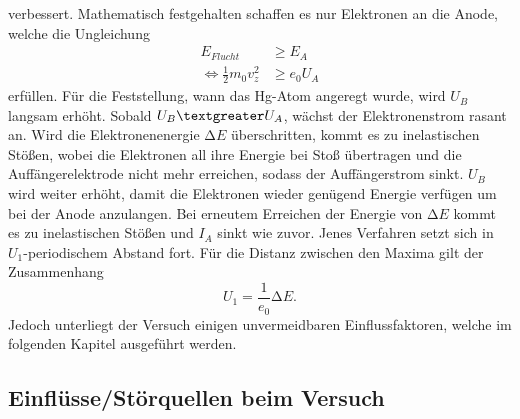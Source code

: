verbessert. Mathematisch festgehalten schaffen es nur Elektronen an die 
Anode, welche die Ungleichung 
\begin{align}
    \label{eqn:3}
                                    E_{Flucht} &\geq E_{A} \\
    \Longleftrightarrow \frac{1}{2} m_0 v_z ^2 &\geq e_0 U_A
\end{align}
erfüllen. Für die Feststellung, wann das Hg-Atom angeregt wurde, wird $U_B$ 
langsam erhöht. Sobald $U_B \textgreater U_A$, wächst der Elektronenstrom rasant 
an. Wird die Elektronenenergie $\increment E$ überschritten, kommt es zu inelastischen 
Stößen, wobei die Elektronen all ihre Energie bei Stoß übertragen und die 
Auffängerelektrode nicht mehr erreichen, sodass der Auffängerstrom sinkt. 
$U_B$ wird weiter erhöht, damit die Elektronen wieder genügend Energie verfügen 
um bei der Anode anzulangen. Bei erneutem Erreichen der Energie von $\increment E$
kommt es zu inelastischen Stößen und $I_A$ sinkt wie zuvor. Jenes Verfahren 
setzt sich in $U_{1}$-periodischem Abstand fort. Für die Distanz zwischen den 
Maxima gilt der Zusammenhang
\begin{equation}
    \label{eqn:4}
    U_1 = \frac{1}{e_0} \increment E.
\end{equation}
\noindent Jedoch unterliegt der Versuch einigen unvermeidbaren Einflussfaktoren, 
welche im folgenden Kapitel ausgeführt werden.

\subsection{Einflüsse/Störquellen beim Versuch}
